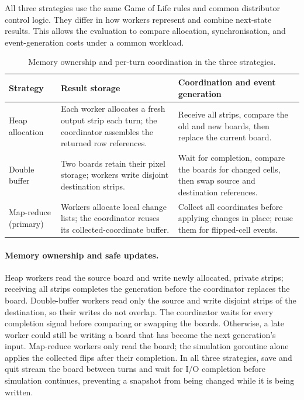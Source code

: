 \documentclass[10pt,a4paper,twocolumn]{article}
\begin{document}
All three strategies use the same Game of Life rules and common distributor
control logic. They differ in how workers represent and combine next-state
results. This allows the evaluation to compare allocation, synchronisation,
and event-generation costs under a common workload.

\begin{table}[t]
\centering
\small
\begin{tabularx}{\linewidth}{@{}lXX@{}}
\toprule
Strategy & Result storage & Coordination and event generation \\
\midrule
Heap allocation & Each worker allocates a fresh output strip each turn;
the coordinator assembles the returned row references. & Receive all strips,
compare the old and new boards, then replace the current board. \\
Double buffer & Two boards retain their pixel storage; workers write
disjoint destination strips. & Wait for completion, compare the boards for
changed cells, then swap source and destination references. \\
Map-reduce (primary) & Workers allocate local change lists; the coordinator
reuses its collected-coordinate buffer. & Collect all coordinates before
applying changes in place; reuse them for flipped-cell events. \\
\bottomrule
\end{tabularx}
\caption{Memory ownership and per-turn coordination in the three strategies.}
\end{table}

\paragraph{Memory ownership and safe updates.}
Heap workers read the source board and write newly allocated, private strips;
receiving all strips completes the generation before the coordinator replaces
the board. Double-buffer workers read only the source and write disjoint strips
of the destination, so their writes do not overlap.
The coordinator waits for every completion signal before comparing or
swapping the boards. Otherwise, a late worker could still be writing a board
that has become the next generation's input. Map-reduce workers only read the
board; the simulation goroutine alone applies the collected flips after their
completion. In all three strategies, save and quit stream the board between
turns and wait for I/O completion before simulation continues, preventing a
snapshot from being changed while it is being written.
\end{document}

